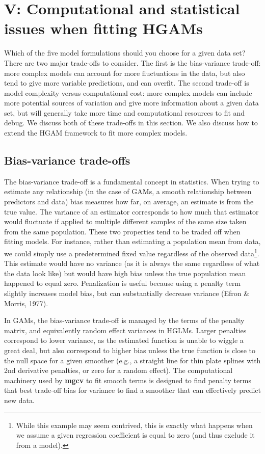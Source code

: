 \documentclass[12pt]{article}
\let\rmarkdownfootnote\footnote%
\def\footnote{\protect\rmarkdownfootnote}
\begin{document}
\FloatBarrier

\section{V: Computational and statistical issues when fitting
HGAMs}\label{v-computational-and-statistical-issues-when-fitting-hgams}

Which of the five model formulations should you choose for a given data
set? There are two major trade-offs to consider. The first is the
bias-variance trade-off: more complex models can account for more
fluctuations in the data, but also tend to give more variable
predictions, and can overfit. The second trade-off is model complexity
versus computational cost: more complex models can include more
potential sources of variation and give more information about a given
data set, but will generally take more time and computational resources
to fit and debug. We discuss both of these trade-offs in this section.
We also discuss how to extend the HGAM framework to fit more complex
models.

\subsection{Bias-variance trade-offs}\label{bias-variance-trade-offs}

The bias-variance trade-off is a fundamental concept in statistics. When
trying to estimate any relationship (in the case of GAMs, a smooth
relationship between predictors and data) bias measures how far, on
average, an estimate is from the true value. The variance of an
estimator corresponds to how much that estimator would fluctuate if
applied to multiple different samples of the same size taken from the
same population. These two properties tend to be traded off when fitting
models. For instance, rather than estimating a population mean from
data, we could simply use a predetermined fixed value regardless of the
observed data\footnote{While this example may seem contrived, this is
  exactly what happens when we assume a given regression coefficient is
  equal to zero (and thus exclude it from a model).}. This estimate
would have no variance (as it is always the same regardless of what the
data look like) but would have high bias unless the true population mean
happened to equal zero. Penalization is useful because using a penalty
term slightly increases model bias, but can substantially decrease
variance (Efron \& Morris, 1977).

In GAMs, the bias-variance trade-off is managed by the terms of the
penalty matrix, and equivalently random effect variances in HGLMs.
Larger penalties correspond to lower variance, as the estimated function
is unable to wiggle a great deal, but also correspond to higher bias
unless the true function is close to the null space for a given smoother
(e.g., a straight line for thin plate splines with 2nd derivative
penalties, or zero for a random effect). The computational machinery
used by \textbf{mgcv} to fit smooth terms is designed to find penalty
terms that best trade-off bias for variance to find a smoother that can
effectively predict new data.
\end{document}
